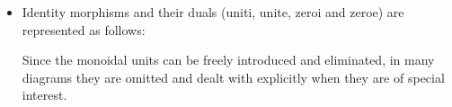 \documentclass[preprint]{sigplanconf}
\begin{document}
\begin{itemize}
\item Identity morphisms and their duals ({{uniti, unite, zeroi}} and
  {{zeroe}}) are represented as follows:
\begin{multicols}{2}
\begin{center}
\end{center}
\begin{center}
\end{center}  
\end{multicols}
\begin{multicols}{2}
\begin{center}
\end{center}
\columnbreak
\begin{center}
\end{center}
\end{multicols}
Since the monoidal units can be freely introduced and eliminated, in
many diagrams they are omitted and dealt with explicitly when they
are of special interest.


\end{itemize}
\end{document}
